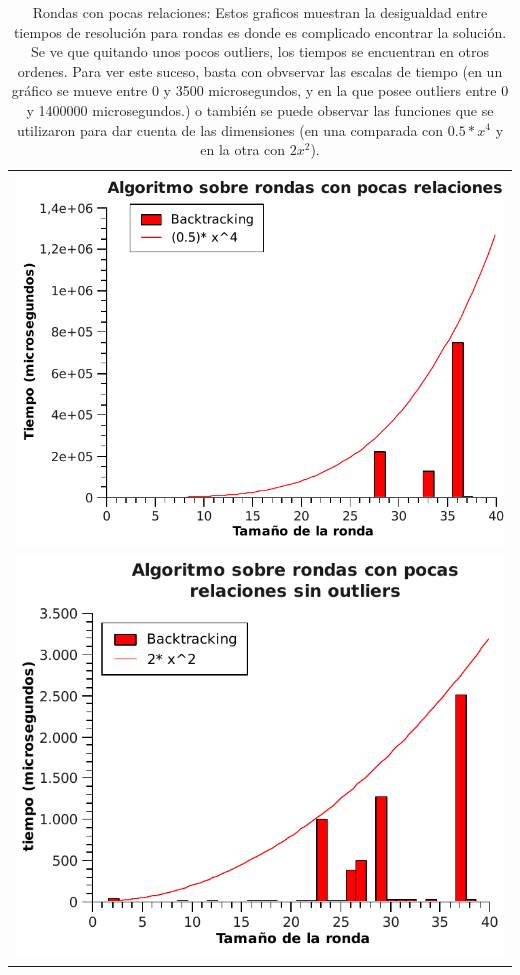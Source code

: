 	\begin{table}[h!] %
		\centering %
			\begin{tabular}{c}
				\includegraphics[scale=0.7]{../Ej_2/Otros/Graficos/Graph10-1.pdf} \\
				\includegraphics[scale=0.7]{../Ej_2/Otros/Graficos/Graph10-2.pdf}
				\end{tabular}
				\caption{Rondas con pocas relaciones: Estos graficos muestran la desigualdad entre tiempos de resolución para rondas es donde es complicado encontrar la solución. Se ve que quitando unos pocos outliers, los tiempos se encuentran en otros ordenes. Para ver este suceso, basta con obvservar las escalas de tiempo (en un gráfico se mueve entre 0 y 3500 microsegundos, y en la que posee outliers entre 0 y 1400000 microsegundos.) o también se puede observar las funciones que se utilizaron para dar cuenta de las dimensiones (en una comparada con $0.5*x^4$ y en la otra con $2x^2$).} %
				\label{tiempoEj2a} %
	\end{table}

